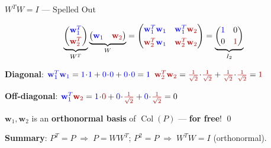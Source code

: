 \documentclass[10pt]{beamer}
\theoremstyle{definition}
\newcommand{\x}[1]{\alert{\textbf{#1}}}
\newcommand{\bl}[1]{{\color{blue}#1}}                 %
\newcommand{\rd}[1]{{\color{red!70!black}#1}}         %
\begin{document}
\begin{frame}{$W^TW = I$ --- Spelled Out}

$$\underbrace{\begin{pmatrix}
\bl{\mathbf{w}_1^T} \\[2pt] \rd{\mathbf{w}_2^T}
\end{pmatrix}}_{W^T}
\underbrace{\begin{pmatrix}
\bl{\mathbf{w}_1} & \rd{\mathbf{w}_2}
\end{pmatrix}}_{W}
=
\begin{pmatrix}
\bl{\mathbf{w}_1^T}\bl{\mathbf{w}_1} & \bl{\mathbf{w}_1^T}\rd{\mathbf{w}_2} \\[4pt]
\rd{\mathbf{w}_2^T}\bl{\mathbf{w}_1} & \rd{\mathbf{w}_2^T}\rd{\mathbf{w}_2}
\end{pmatrix}
=
\underbrace{\begin{pmatrix}
\bl{1} & 0 \\[2pt]
0 & \rd{1}
\end{pmatrix}}_{I_2}$$

\vspace{0.3em}

\x{Diagonal}: $\bl{\mathbf{w}_1^T}\bl{\mathbf{w}_1} = \bl{1}\!\cdot\!\bl{1} + \bl{0}\!\cdot\!\bl{0} + \bl{0}\!\cdot\!\bl{0} = \bl{1}$ \;\checkmark \quad
$\rd{\mathbf{w}_2^T}\rd{\mathbf{w}_2} = \rd{\frac{1}{\sqrt{2}}}\!\cdot\!\rd{\frac{1}{\sqrt{2}}} + \rd{\frac{1}{\sqrt{2}}}\!\cdot\!\rd{\frac{1}{\sqrt{2}}} = \rd{1}$ \;\checkmark

\vspace{0.3em}

\x{Off-diagonal}: $\bl{\mathbf{w}_1^T}\rd{\mathbf{w}_2} = \bl{1}\!\cdot\!\rd{0} + \bl{0}\!\cdot\!\rd{\frac{1}{\sqrt{2}}} + \bl{0}\!\cdot\!\rd{\frac{1}{\sqrt{2}}} = 0$ \;\checkmark

\vspace{0.5em}

$\mathbf{w}_1, \mathbf{w}_2$ is an \x{orthonormal basis} of $\operatorname{Col}(P)$ --- \x{for free}! \qed

\vspace{0.3em}

\x{Summary}: $P^T\!=\!P \;\Longrightarrow\; P = WW^T$; \quad $P^2\!=\!P \;\Longrightarrow\; W^TW = I$ (orthonormal).

\end{frame}
\end{document}
